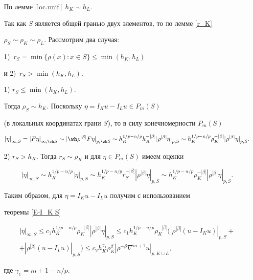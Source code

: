 \begin{pf}


По лемме \ref{loc.unif.}\; $h_K \sim h_L$. 


Так как $S$ является общей гранью двух элементов, то по лемме \ref{r_K}\;


$\rho_S \sim \rho_K \sim \rho_L$. Рассмотрим два случая: 


1)~$r_S=\min\{\rho(x): x \in S\} \le \min(h_K,h_L)$


и 2)~$r_S >\min(h_K,h_L)$. 





1) $r_S \le \min(h_K,h_L)$.


Тогда $\rho_S \sim h_K$. Поскольку $\eta =I_K u- I_L u \in P_m(S)$ 


(в локальных координатах грани $S$), то в силу конечномерности $P_m(S)$ 


$$


{|\eta|}_{\infty,S} =


{|F\eta|}_{\infty,\wh S}\sim {|\wh \rho^{|\beta|}F\eta|}_{p,\wh S}


\sim h_K^{1/p-n/p} h_K^{-|\beta|}{|\rho^{|\beta|}\eta|}_{p,S}


\sim h_K^{1/p-n/p} \rho_K^{-|\beta|}{|\rho^{|\beta|}\eta|}_{p,S}.


$$





2) $r_S > h_K$. Тогда $r_S \sim \rho_K$ и для $\eta \in P_m(S)$ имеем оценки 


$$


{|\eta|}_{\infty,S}\sim h_K^{1/p-n/p}{|\eta|}_{p,S}


\sim h_K^{1/p-n/p}r_S^{-|\beta|}{|\rho^{|\beta|}\eta|}_{p,S}


\sim h_K^{1/p-n/p}\rho_K^{-|\beta|}{|\rho^{|\beta|}\eta|}_{p,S}.


$$





Таким образом, для $\eta=I_Ku-I_Lu$ получим с использованием 


теоремы \ref{E-I_K S} 


\begin{multline*}


{|\eta|}_{\infty,S} \le c_1 h_K^{1/p-n/p}


\rho_K^{-|\beta|}{|\rho^{|\beta|}\eta|}_{p,S} 


\le c_1 h_K^{1/p-n/p}\rho_K^{-|\beta|}


({|\rho^{|\beta|}(u-I_Ku)|}_{p,S}+\\


%


+{|\rho^{|\beta|}(u-I_Lu)|}_{p,S}) \le c_2 h_K^{\gamma_1} 


\rho_K^\beta{|\rho^{-\beta}\nabla^{m+1}u|}_{p,K \cup L}, 


\end{multline*}


где $\gamma_1=m+1-n/p.$


\end{pf}





